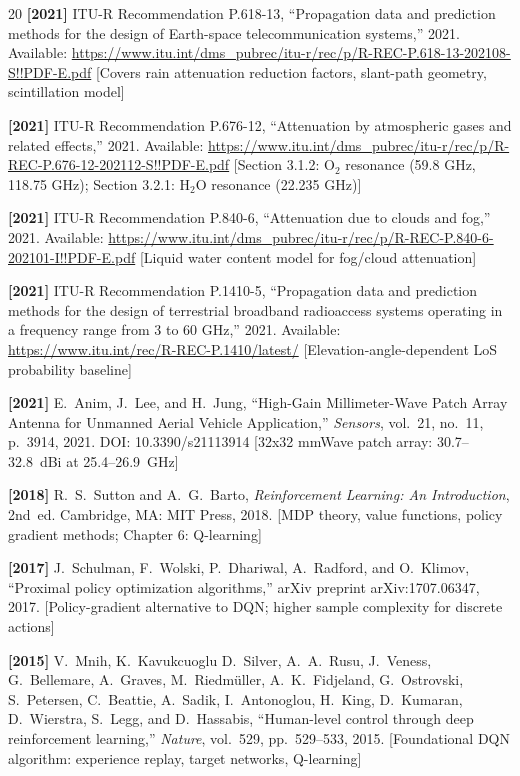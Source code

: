 \begin{thebibliography}{20}
\textbf{[2021]} ITU-R Recommendation P.618-13, ``Propagation data and prediction methods for the
design of Earth-space telecommunication systems,'' 2021.
Available: \url{https://www.itu.int/dms_pubrec/itu-r/rec/p/R-REC-P.618-13-202108-S!!PDF-E.pdf}
[Covers rain attenuation reduction factors, slant-path geometry, scintillation model]

\textbf{[2021]} ITU-R Recommendation P.676-12, ``Attenuation by atmospheric gases and related
effects,'' 2021.
Available: \url{https://www.itu.int/dms_pubrec/itu-r/rec/p/R-REC-P.676-12-202112-S!!PDF-E.pdf}
[Section 3.1.2: O$_2$ resonance (59.8 GHz, 118.75 GHz); Section 3.2.1: H$_2$O resonance (22.235 GHz)]

\textbf{[2021]} ITU-R Recommendation P.840-6, ``Attenuation due to clouds and fog,'' 2021.
Available: \url{https://www.itu.int/dms_pubrec/itu-r/rec/p/R-REC-P.840-6-202101-I!!PDF-E.pdf}
[Liquid water content model for fog/cloud attenuation]

\textbf{[2021]} ITU-R Recommendation P.1410-5, ``Propagation data and prediction methods for the
design of terrestrial broadband radioaccess systems operating in a frequency range
from 3 to 60 GHz,'' 2021.
Available: \url{https://www.itu.int/rec/R-REC-P.1410/latest/}
[Elevation-angle-dependent LoS probability baseline]

\textbf{[2021]} E.~Anim, J.~Lee, and H.~Jung, ``High-Gain Millimeter-Wave Patch Array Antenna
for Unmanned Aerial Vehicle Application,'' \emph{Sensors}, vol.~21, no.~11,
p.~3914, 2021.
DOI: 10.3390/s21113914
[32x32 mmWave patch array: 30.7--32.8~dBi at 25.4--26.9~GHz]

\textbf{[2018]} R.~S.~Sutton and A.~G.~Barto, \emph{Reinforcement Learning: An Introduction},
2nd~ed. Cambridge, MA: MIT Press, 2018.
[MDP theory, value functions, policy gradient methods; Chapter 6: Q-learning]

\textbf{[2017]} J.~Schulman, F.~Wolski, P.~Dhariwal, A.~Radford, and O.~Klimov,
``Proximal policy optimization algorithms,'' arXiv preprint arXiv:1707.06347, 2017.
[Policy-gradient alternative to DQN; higher sample complexity for discrete actions]

\textbf{[2015]} V.~Mnih, K.~Kavukcuoglu D.~Silver, A.~A.~Rusu, J.~Veness, G.~Bellemare,
A.~Graves, M.~Riedmüller, A.~K.~Fidjeland, G.~Ostrovski, S.~Petersen,
C.~Beattie, A.~Sadik, I.~Antonoglou, H.~King, D.~Kumaran, D.~Wierstra,
S.~Legg, and D.~Hassabis, ``Human-level control through deep reinforcement
learning,'' \emph{Nature}, vol.~529, pp.~529--533, 2015.
[Foundational DQN algorithm: experience replay, target networks, Q-learning]


\end{thebibliography}
